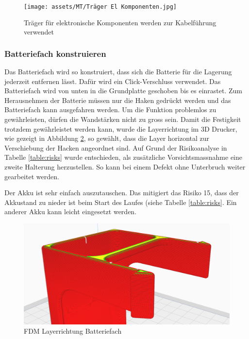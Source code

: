 \begin{figure}[H]
\centering
\texttt{[image: assets/MT/Träger El Komponenten.jpg]}
\caption{Träger für elektronische Komponenten werden zur Kabelführung verwendet}
\label{fig: Träger für elektronische Komponenten}
\end{figure}

\subsubsection{Batteriefach konstruieren}
\label{Batteriefach konstruieren}

Das Batteriefach wird so konstruiert, dass sich die Batterie für die Lagerung jederzeit entfernen lässt. Dafür wird ein Click-Verschluss verwendet. Das Batteriefach wird von unten in die Grundplatte geschoben bis es einrastet. Zum Herausnehmen der Batterie müssen nur die Haken gedrückt werden und das Batteriefach kann ausgefahren werden. Um die Funktion problemlos zu gewährleisten, dürfen die Wandstärken nicht zu gross sein. Damit die Festigkeit trotzdem gewährleistet werden kann, wurde die Layerrichtung im 3D Drucker, wie gezeigt in Abbildung \ref{Layerrichtung Batteriefach}, so gewählt, dass die Layer horizontal zur Verschiebung der Hacken angeordnet sind. Auf Grund der Risikoanalyse in Tabelle \ref{table:risks} wurde entschieden, als zusätzliche Vorsichtsmassnahme eine zweite Halterung herzustellen. So kann bei einem Defekt ohne Unterbruch weiter gearbeitet werden.

Der Akku ist sehr einfach auszutauschen. Das mitigiert das Risiko 15, dass der Akkustand zu nieder ist beim Start des Laufes (siehe Tabelle \ref{table:risks}. Ein anderer Akku kann leicht eingesetzt werden.


\begin{figure}[H]
\centering
\includegraphics[width=\textwidth]{assets/MT/Layer_Batterie Fach.png}
\caption{FDM Layerrichtung Batteriefach}
\label{Layerrichtung Batteriefach}
\end{figure}

